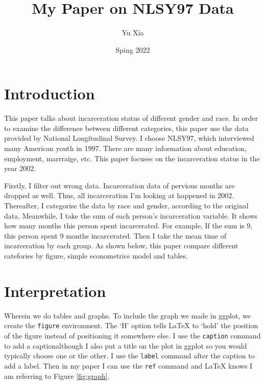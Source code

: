 \documentclass{article}
\author{Yu Xia}
\title{My Paper on NLSY97 Data}
\date{Sping 2022}
\begin{document}
\maketitle

\section{Introduction}

This paper talks about incarceration status of different gender and race. In order to examine the difference between different categories, this paper use the data provided by National Longitudinal Survey. I choose NLSY97, which interviewed many American youth in 1997. There are many information about education, employment, marrraige, etc. This paper focuses on the incarceration status in the year 2002.

Firstly, I filter out wrong data. Incarceration data of pervious months are dropped as well. Thus, all incarceration I'm looking at happened in 2002. Thereafter, I categorise the data by race and gender, according to the original data. Meanwhile, I  take the sum of each person's incarceration variable. It shows how many months this person spent incarcerated. For example, If the sum is 9, this person spent 9 months incarcerated. Then I take the mean time of incarceration by each group. As shown below, this paper compare different catefories by figure, simple econometrics model and tables. 

\newpage

\section{Interpretation}

Wherein we do tables and graphs. To include the graph we made in ggplot, we create the \texttt{figure} environment. The `H' option tells LaTeX to `hold' the position of the figure instead of positioning it somewhere else. I use the \texttt{caption} command to add a caption{\textemdash}although I also put a title on the plot in ggplot so you would typically choose one or the other. I use the \texttt{label} command after the caption to add a label. Then in my paper I can use the \texttt{ref} command and LaTeX knows I am referring to Figure \ref{fig:graph}.
\end{document}
